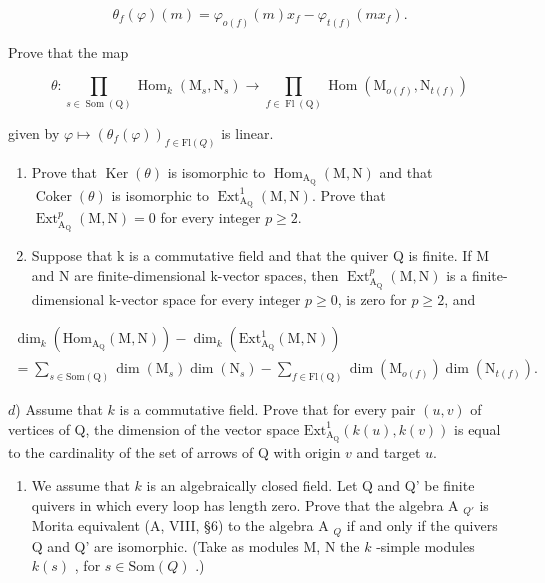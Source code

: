 \[
\theta_ {f} (\varphi) (m) = \varphi_ {o (f)} (m) x _ {f} - \varphi_ {t (f)} (m x _ {f}).
\]

Prove that the map

\[
\theta \colon \prod_ {s \in \operatorname{Som} (\mathrm{Q})} \operatorname{Hom} _ {k} \left(\mathrm{M} _ {s}, \mathrm{N} _ {s}\right)\rightarrow \prod_ {f \in \operatorname{Fl} (\mathrm{Q})} \operatorname{Hom} \left(\mathrm{M} _ {o (f)}, \mathrm{N} _ {t (f)}\right)
\]

 given by \(\varphi\mapsto(\theta_{f}(\varphi))_{f\in\mathrm{Fl}(Q)}\) is linear.

\begin{enumerate}
\def\labelenumi{\alph{enumi})}
\setcounter{enumi}{1}
\item
  Prove that \(\operatorname{Ker}(\theta)\) is isomorphic to \(\operatorname{Hom}_{\mathrm{A}_{\mathrm{Q}}}(\mathrm{M},\mathrm{N})\) and that \(\operatorname{Coker}(\theta)\) is isomorphic to \(\operatorname{Ext}_{\mathrm{A}_{\mathrm{Q}}}^{1}(\mathrm{M},\mathrm{N})\). Prove that \(\operatorname{Ext}_{\mathrm{A}_{\mathrm{Q}}}^{p}(\mathrm{M},\mathrm{N}) = 0\) for every integer \(p \geqslant 2\).
\item
  Suppose that k is a commutative field and that the quiver Q is finite. If M and N are finite-dimensional k-vector spaces, then \(\operatorname{Ext}_{\mathrm{A}_{\mathrm{Q}}}^{p}(\mathrm{M},\mathrm{N})\) is a finite-dimensional k-vector space for every integer \(p \geqslant 0\), is zero for \(p \geqslant 2\), and
\end{enumerate}

\[
\begin{array}{l} \dim_ {k} (\mathrm{Hom} _ {\mathrm{A} _ {\mathrm{Q}}} (\mathrm{M}, \mathrm{N})) - \dim_ {k} (\mathrm{Ext} _ {\mathrm{A} _ {\mathrm{Q}}} ^ {1} (\mathrm{M}, \mathrm{N})) \\ = \sum_ {s \in \mathrm{Som} (\mathrm{Q})} \dim (\mathrm{M} _ {s}) \dim (\mathrm{N} _ {s}) - \sum_ {f \in \mathrm{Fl} (\mathrm{Q})} \dim (\mathrm{M} _ {o (f)}) \dim (\mathrm{N} _ {t (f)}). \end{array}
\]

\(d\)) Assume that \(k\) is a commutative field. Prove that for every pair \((u,v)\) of vertices of Q, the dimension of the vector space \(\mathrm{Ext}_{\mathrm{A_Q}}^1 (k(u),k(v))\) is equal to the cardinality of the set of arrows of Q with origin \(v\) and target \(u\).

\begin{enumerate}
\def\labelenumi{\arabic{enumi})}
\setcounter{enumi}{9}
\item
  We assume that \(k\) is an algebraically closed field. Let Q and Q' be finite quivers in which every loop has length zero. Prove that the algebra A \(_{Q'}\) is Morita equivalent (A, VIII, §6) to the algebra A \(_{Q}\) if and only if the quivers Q and Q' are isomorphic. (Take as modules M, N the \(k\) -simple modules \(k(s)\) , for \(s \in \text{Som}(Q)\) .)
\end{enumerate}

